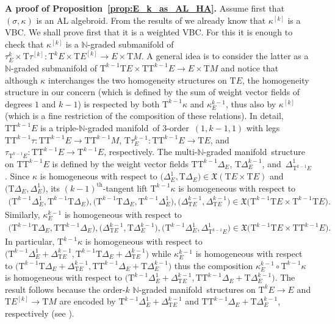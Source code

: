 \documentclass[10pt,a4paper]{amsart}
\newcommand{\grB}{{$\N$-graded manifold}}
\newcommand{\ZM}{{VBC}} %
\newcommand{\degree}{{order}}
\newcommand{\thh}[1]{#1^{\mathrm{th}}} %
\newcommand{\N}{\mathbb{N}}
\newcommand{\ra}{\rightarrow}
\newcommand{\E}[1]{E^{[#1]}} %
\newcommand{\T}{\mathrm{T}} %
\newcommand{\TT}[1]{\mathrm{T}^{#1}} %
\newcommand{\VF}{\mathfrak{X}}
\numberwithin{equation}{section}
\theoremstyle{definition}
\begin{document}
{\bf A proof of Proposition~\ref{prop:E_k_as_AL_HA}.} %
 Assume first that $(\sigma,\kappa)$ is an AL algebroid. From the results of \cite[Theorem~4.5(ix)]{MJ_MR_models_high_alg_2015} we already know that $\kappa^{[k]}$ is a \ZM . We shall prove first that it is a weighted \ZM . For this it is enough to check that $\kappa^{[k]}$ is a $\N$-graded submani\-fold of $\tau^k_E\times \T\tau^{[k]}\colon \TT{k} E\times \T\E{k} \ra E\times \T M$. A general idea is to consider the latter as a $\N$-graded submanifold of $\TT{k-1}\T E\times \T\TT{k-1} E\ra E\times \T M$ and notice that although $\kappa$ interchanges the two homogeneity structures on $\T E$, the homogeneity structure in our concern (which is defined by the sum of weight vector fields of degrees $1$ and $k-1$) is respected by both $\TT{k-1}\kappa$ and $\kappa^{k-1}_E$, thus also by $\kappa^{[k]}$ (which is a fine restriction of the composition of these relations). In detail,
$\T\TT{k-1} E$ is a triple-\grB\ of $3$-\degree\ $(1, k-1, 1)$ with legs $\T\TT{k-1} \tau\colon \T\TT{k-1} E\ra \T\TT{k-1} M$, $\T\tau^{k-1}_E\colon \T\TT{k-1} E \ra \T E$, and $\tau_{\TT{k-1} E}\colon \T\TT{k-1} E\ra \TT{k-1} E$, respectively. The multi-\grB\ structure on $\T\TT{k-1} E$ is defined by the weight vector fields $\T\TT{k-1}\Delta_E$, $\T\Delta^{k-1}_E$, and~$\Delta^1_{\TT{k-1} E}$. Since $\kappa$ is homogeneous with respect to $\big(\Delta^1_E, \T\Delta_E\big)\in\VF(\T E \times \T E)$ and $\big(\T\Delta_E, \Delta^1_E\big)$, its $\thh{(k-1)}$-tangent lift $\TT{k-1}\kappa$ is homogeneous with respect to
\begin{gather*}\big(\TT{k-1}\Delta^1_E, \TT{k-1}\T\Delta_E\big), \big(\TT{k-1}\T\Delta_E, \TT{k-1}\Delta^1_E\big), \big(\Delta^{k-1}_{\T E}, \Delta^{k-1}_{\T E}\big) \in \VF\big(\TT{k-1} \T E \times \TT{k-1} \T E\big).\end{gather*}
Similarly, $\kappa^{k-1}_E$ is homogeneous with respect to
\begin{gather*}
\big(\TT{k-1}\T\Delta_E, \T\TT{k-1} \Delta_E\big), \big(\Delta^{k-1}_{\T E}, \T\Delta^{k-1}_E\big), \big(\TT{k-1} \Delta^1_E, \Delta^1_{\TT{k-1} E}\big) \in \VF\big(\TT{k-1}\T E\times \T \TT{k-1} E\big).
\end{gather*}
In particular, $\TT{k-1}\kappa$ is homogeneous with respect to $\big(\TT{k-1}\Delta^1_E+\Delta^{k-1}_{\T E}, \TT{k-1}\T\Delta_E + \Delta^{k-1}_{\T E}\big)$ while $\kappa^{k-1}_E$ is homogeneous with respect to $\big(\TT{k-1}\T\Delta_E + \Delta^{k-1}_{\T E}, \T\TT{k-1} \Delta_E+\T \Delta^{k-1}_E\big)$ thus the composition $\kappa^{k-1}_E\circ \TT{k-1}\kappa$ is homogeneous with respect to $\big(\TT{k-1}\Delta^1_E+\Delta^{k-1}_{\T E}, \T\TT{k-1} \Delta_E+\T \Delta^{k-1}_E\big)$. The result follows because the \degree-$k$ \grB\ structures on $\TT{k} E \ra E$ and $\T\E{k}\ra \T M$ are encoded by $\TT{k-1}\Delta^1_E+\Delta^{k-1}_{\T E}$ and $\T\TT{k-1} \Delta_E+\T \Delta^{k-1}_E$, respectively (see \cite[Theorem~4.5(i)]{MJ_MR_models_high_alg_2015}).
\end{document}
